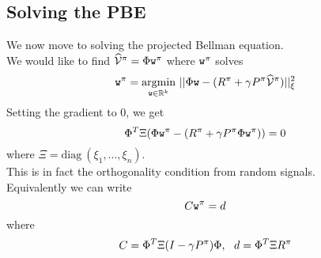 \subsection{Solving the PBE}
We now move to solving the projected Bellman equation.\\
We would like to find $\widehat{\mathcal{V}}^{\pi} = \Phi \texttt{w}^{\pi}$ where $\texttt{w}^{\pi}$ solves
$$\texttt{w}^{\pi} = \underset{{\texttt{w} \in \mathbb{R}^k}}{\operatorname{argmin}} \ ||\Phi \texttt{w} - (R^\pi+\gamma P^\pi\widehat{\mathcal{V}}^{\pi})||_\xi^2$$
Setting the gradient to $0$, we get
$$\Phi^T \Xi (\Phi \texttt{w}^{\pi} - (R^\pi+\gamma P^\pi \Phi \texttt{w}^{\pi})) = 0$$
where $\Xi = \textrm{diag} \ (\xi_1,...,\xi_n)$.\\
This is in fact the orthogonality condition from random signals.\\
Equivalently we can write
$$C \texttt{w}^{\pi} = d$$
where
$$C = \Phi^T \Xi(I-\gamma P^\pi) \Phi, \ \ d = \Phi^T\Xi R^\pi$$

